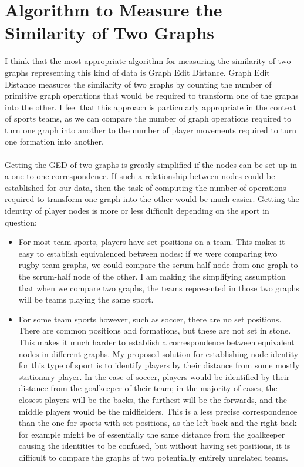 \documentclass[a4paper,11pt]{article}
\begin{document}
\section{Algorithm to Measure the Similarity of Two Graphs}
I think that the most appropriate algorithm for measuring the similarity of two graphs representing this kind of data is 
Graph Edit Distance. 
Graph Edit Distance measures the similarity of two graphs by counting the number of primitive graph operations that would 
be required to transform one of the graphs into the other. 
I feel that this approach is particularly appropriate in the context of sports teams, as we can compare the number of 
graph operations required to turn one graph into another to the number of player movements required to turn one formation 
into another.
\\\\
Getting the GED of two graphs is greatly simplified if the nodes can be set up in a one-to-one correspondence. 
If such a relationship between nodes could be established for our data, then the task of computing the number of operations 
required to transform one graph into the other would be much easier.
Getting the identity of player nodes is more or less difficult depending on the sport in question:
\begin{itemize}
    \item   For most team sports, players have set positions on a team.
            This makes it easy to establish equivalenced between nodes: if we were comparing two rugby team graphs, we 
            could compare the scrum-half node from one graph to the scrum-half node of the other.
            I am making the simplifying assumption that when we compare two graphs, the teams represented in those two 
            graphs will be teams playing the same sport. 

    \item   For some team sports however, such as soccer, there are no set positions. 
            There are common positions and formations, but these are not set in stone.
            This makes it much harder to establish a correspondence between equivalent nodes in different graphs.
            My proposed solution for establishing node identity for this type of sport is to identify players by their 
            distance from some mostly stationary player. 
            In the case of soccer, players would be identified by their distance from the goalkeeper of their team;
            in the majority of cases, the closest players will be the backs, the furthest will be the forwards, and the 
            middle players would be the midfielders.
            This is a less precise correspondence than the one for sports with set positions, as the left back and the 
            right back for example might be of essentially the same distance from the goalkeeper causing the identities to 
            be confused, but without having set positions, it is difficult to compare the graphs of two potentially entirely 
            unrelated teams.
\end{itemize}
\end{document}
